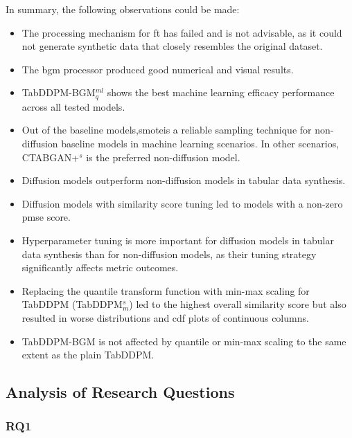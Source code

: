In summary, the following observations could be made:

\begin{itemize}
	\item The processing mechanism for \gls{ft} has failed and is not advisable, as it could not generate synthetic data that closely resembles the original dataset.
	\item The \gls{bgm} processor produced good numerical and visual results.
	\item TabDDPM-BGM$^{ml}_q$ shows the best machine learning efficacy performance across all tested models.
	\item Out of the baseline models,\gls{smote}is a reliable sampling technique for non-diffusion baseline models in machine learning scenarios.
	      In other scenarios, CTABGAN+$^{s}$ is the preferred non-diffusion model.
	\item Diffusion models outperform non-diffusion models in tabular data synthesis.
	\item Diffusion models with similarity score tuning led to models with a non-zero \gls{pmse} score.
	\item Hyperparameter tuning is more important for diffusion models in tabular data synthesis than for non-diffusion models, as their tuning strategy significantly affects metric outcomes.
	\item Replacing the quantile transform function with min-max scaling for TabDDPM (TabDDPM$^{s}_m$) led to the highest overall similarity score but also resulted in worse distributions and \gls{cdf} plots of continuous columns.
	\item TabDDPM-BGM is not affected by quantile or min-max scaling to the same extent as the plain TabDDPM.
\end{itemize}

\subsection*{Analysis of Research Questions}

\subsubsection{RQ1}

